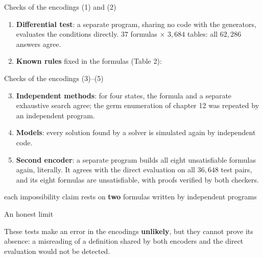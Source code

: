 \begin{frame}{Checks of the encodings (1) and (2)}
\small
\begin{enumerate}[(1)]
\item \textbf{Differential test}: a separate program, sharing no code with the generators, evaluates the conditions directly. $37$ formulas $\times$ $3{,}684$ tables: all $62{,}286$ answers agree.
\item \textbf{Known rules} fixed in the formulas (Table 2):
\end{enumerate}
\vspace{0.5ex}
\centering\fig[0.38]{}
\end{frame}

\begin{frame}{Checks of the encodings (3)--(5)}
\begin{enumerate}[(1)]\setcounter{enumi}{2}
\item \textbf{Independent methods}: for four states, the formula and a separate exhaustive search agree; the germ enumeration of chapter 12 was repeated by an independent program.
\item \textbf{Models}: every solution found by a solver is simulated again by independent code.
\item \textbf{Second encoder}: a separate program builds all eight unsatisfiable formulas again, literally. It agrees with the direct evaluation on all $36{,}648$ test pairs, and its eight formulas are unsatisfiable, with proofs verified by both checkers.
\end{enumerate}
\begin{plainbox}\centering each impossibility claim rests on \textbf{two} formulas written by independent programs\end{plainbox}
\end{frame}

\begin{frame}{An honest limit}
\vspace{5ex}
\begin{plainbox}\large
These tests make an error in the encodings \textbf{unlikely}, but they cannot prove its absence: a misreading of a definition shared by both encoders and the direct evaluation would not be detected.
\end{plainbox}
\end{frame}

